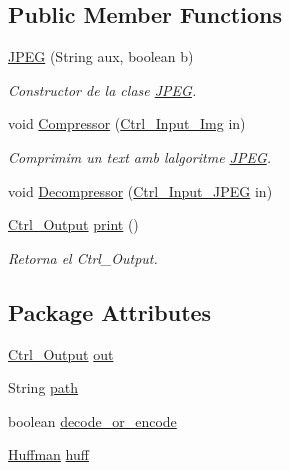 \subsection*{Public Member Functions}
\begin{DoxyCompactItemize}
\item 
\hyperlink{classdomini_1_1algorithm_1_1JPEG_a9dce5a80ccc8b626758cb4ae0b93e056}{J\+P\+EG} (String aux, boolean b)
\begin{DoxyCompactList}\small\item\em Constructor de la clase \hyperlink{classdomini_1_1algorithm_1_1JPEG}{J\+P\+EG}. \end{DoxyCompactList}\item 
void \hyperlink{classdomini_1_1algorithm_1_1JPEG_a457ac869c214dffce8a78c0c14c4bf8b}{Compressor} (\hyperlink{classpersistencia_1_1input_1_1Ctrl__Input__Img}{Ctrl\+\_\+\+Input\+\_\+\+Img} in)
\begin{DoxyCompactList}\small\item\em Comprimim un text amb l\textquotesingle{}algoritme \hyperlink{classdomini_1_1algorithm_1_1JPEG}{J\+P\+EG}. \end{DoxyCompactList}\item 
void \hyperlink{classdomini_1_1algorithm_1_1JPEG_af78f9030854c1823d28f34f2205d6740}{Decompressor} (\hyperlink{classpersistencia_1_1input_1_1Ctrl__Input__JPEG}{Ctrl\+\_\+\+Input\+\_\+\+J\+P\+EG} in)
\item 
\hyperlink{classpersistencia_1_1output_1_1Ctrl__Output}{Ctrl\+\_\+\+Output} \hyperlink{classdomini_1_1algorithm_1_1JPEG_a02fa1a8d05204b71cf6d5e8d6bbd3d2b}{print} ()
\begin{DoxyCompactList}\small\item\em Retorna el Ctrl\+\_\+\+Output. \end{DoxyCompactList}\end{DoxyCompactItemize}
\subsection*{Package Attributes}
\begin{DoxyCompactItemize}
\item 
\hyperlink{classpersistencia_1_1output_1_1Ctrl__Output}{Ctrl\+\_\+\+Output} \hyperlink{classdomini_1_1algorithm_1_1JPEG_a2512a38136dac55fa5dbbfc8f0ae822d}{out}
\item 
String \hyperlink{classdomini_1_1algorithm_1_1JPEG_a68d523efc6a9dfb3dd2edec0bbb79b48}{path}
\item 
boolean \hyperlink{classdomini_1_1algorithm_1_1JPEG_a3ff24cf46363c31ffa24e3604bf3ced8}{decode\+\_\+or\+\_\+encode}
\item 
\hyperlink{classdomini_1_1algorithm_1_1Huffman}{Huffman} \hyperlink{classdomini_1_1algorithm_1_1JPEG_aacc6445baa7819e3f9139ffb78e0b8f4}{huff}
\end{DoxyCompactItemize}
